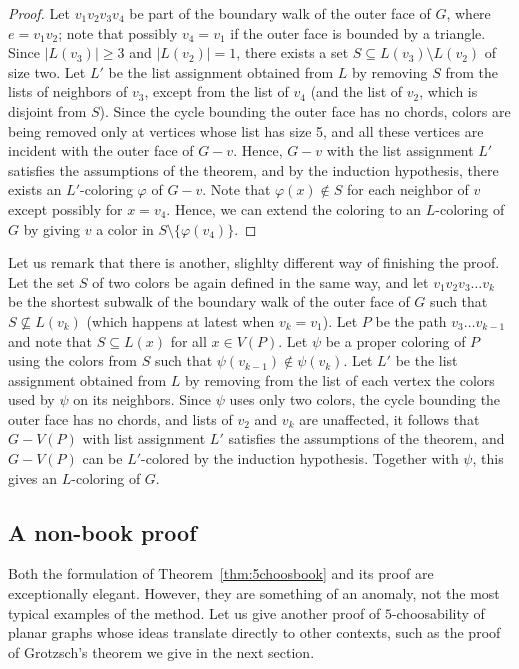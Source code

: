 \documentclass[12pt,twoside,openright,a4paper]{book}
\begin{document}
\begin{proof}
Let $v_1v_2v_3v_4$ be part of the boundary walk of the outer face of $G$, where $e=v_1v_2$; note that possibly $v_4=v_1$
if the outer face is bounded by a triangle.  Since $|L(v_3)|\ge 3$ and $|L(v_2)|=1$, there exists a set $S\subseteq L(v_3)\setminus L(v_2)$
of size two.  Let $L'$ be the list assignment obtained from $L$ by removing $S$ from the lists of neighbors of $v_3$, except
from the list of $v_4$ (and the list of $v_2$, which is disjoint from $S$).  Since the cycle bounding the outer
face has no chords, colors are being removed only at vertices whose list has size 5, and all these vertices are incident
with the outer face of $G-v$.  Hence, $G-v$ with the list assignment $L'$ satisfies the assumptions of the theorem, and
by the induction hypothesis, there exists an $L'$-coloring $\varphi$ of $G-v$.  Note that $\varphi(x)\not\in S$ for
each neighbor of $v$ except possibly for $x=v_4$.  Hence, we can extend the coloring to an $L$-coloring of $G$ by giving $v$
a color in $S\setminus\{\varphi(v_4)\}$.
\end{proof}

Let us remark that there is another, slighlty different way of finishing the proof.  Let the set $S$ of two colors
be again defined in the same way, and let $v_1v_2v_3\ldots v_k$ be the shortest subwalk of the boundary walk of the outer face
of $G$ such that $S\not\subseteq L(v_k)$ (which happens at latest when $v_k=v_1$).  Let $P$ be the path $v_3\ldots v_{k-1}$
and note that $S\subseteq L(x)$ for all $x\in V(P)$.  Let $\psi$ be a proper coloring of $P$ using the colors from $S$
such that $\psi(v_{k-1})\not\in\psi(v_k)$.  Let $L'$ be the list assignment obtained from $L$ by removing from the list
of each vertex the colors used by $\psi$ on its neighbors.  Since $\psi$ uses only two colors, the cycle bounding the outer
face has no chords, and lists of $v_2$ and $v_k$ are unaffected, it follows that $G-V(P)$ with list assignment $L'$
satisfies the assumptions of the theorem, and $G-V(P)$ can be $L'$-colored by the induction hypothesis.  Together with $\psi$,
this gives an $L$-coloring of $G$.

\subsection{A non-book proof}

Both the formulation of Theorem~\ref{thm:5choosbook} and its proof are exceptionally elegant.
However, they are something of an anomaly, not the most typical examples of the method.
Let us give another proof of $5$-choosability of planar graphs whose ideas translate directly to other
contexts, such as the proof of Grotzsch's theorem we give in the next section.
\end{document}
